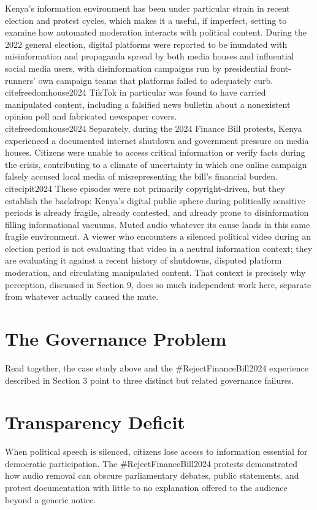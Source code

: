 \documentclass{article}
\begin{document}
\par 
Kenya’s information environment has been under particular strain in recent election and protest cycles, which makes it a useful, if imperfect, setting to examine how automated moderation interacts with political content. During the 2022 general election, digital platforms were reported to be inundated with misinformation and propaganda spread by both media houses and influential social media users, with disinformation campaigns run by presidential front-runners’ own campaign teams that platforms failed to adequately curb. \\cite{freedomhouse2024} TikTok in particular was found to have carried manipulated content, including a falsified news bulletin about a nonexistent opinion poll and fabricated newspaper covers. \\cite{freedomhouse2024}
Separately, during the 2024 Finance Bill protests, Kenya experienced a documented internet shutdown and government pressure on media houses. Citizens were unable to access critical information or verify facts during the crisis, contributing to a climate of uncertainty in which one online campaign falsely accused local media of misrepresenting the bill’s financial burden. \\cite{cipit2024} These episodes were not primarily copyright-driven, but they establish the backdrop: Kenya’s digital public sphere during politically sensitive periods is already fragile, already contested, and already prone to disinformation filling informational vacuums. Muted audio whatever its cause lands in this same fragile environment. A viewer who encounters a silenced political video during an election period is not evaluating that video in a neutral information context; they are evaluating it against a recent history of shutdowns, disputed platform moderation, and circulating manipulated content. That context is precisely why perception, discussed in Section 9, does so much independent work here, separate from whatever actually caused the mute.
\section{The Governance Problem}
\par 
Read together, the case study above and the \#RejectFinanceBill2024 experience described in Section 3 point to three distinct but related governance failures.
\section{Transparency Deficit}
\par 
When political speech is silenced, citizens lose access to information essential for democratic participation. The \#RejectFinanceBill2024 protests demonstrated how audio removal can obscure parliamentary debates, public statements, and protest documentation with little to no explanation offered to the audience beyond a generic notice.
\end{document}
